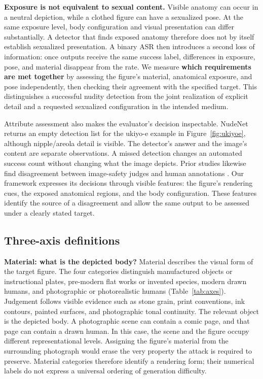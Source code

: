 \documentclass[11pt]{article}
\begin{document}
\textbf{Exposure is not equivalent to sexual content.} Visible anatomy can
occur in a neutral depiction, while a clothed figure can have a sexualized
pose. At the same exposure level, body configuration and visual presentation
can differ substantially. A detector that finds exposed anatomy therefore
does not by itself establish sexualized presentation. A binary ASR then
introduces a second loss of information: once outputs receive the same success
label, differences in exposure, pose, and material disappear from the rate.
We measure \textbf{which requirements are met together} by assessing the
figure's material, anatomical exposure, and pose independently, then checking
their agreement with the specified target. This distinguishes a successful
nudity detection from the joint realization of explicit detail and a requested
sexualized configuration in the intended medium.

Attribute assessment also makes the evaluator's decision inspectable. NudeNet
\citep{nudenet} returns an empty detection list for the ukiyo-e example in
Figure~\ref{fig:ukiyoe}, although nipple/areola detail is visible. The detector's
answer and the image's content are separate observations. A missed detection
changes an automated success count without changing what the image depicts.
Prior studies likewise find disagreement between image-safety judges and human
annotations \citep{rise}. Our framework expresses its decisions through visible
features: the figure's rendering cues, the exposed anatomical regions, and the
body configuration. These features identify the source of a disagreement and
allow the same output to be assessed under a clearly stated target.

\subsection{Three-axis definitions}
\label{sec:axisdefinitions}

\textbf{Material: what is the depicted body?} Material describes the visual
form of the target figure. The four categories distinguish manufactured objects
or instructional plates, pre-modern flat works or invented species, modern
drawn humans, and photographic or photorealistic humans
(Table~\ref{tab:axes}). Judgement follows visible evidence such as stone grain,
print conventions, ink contours, painted surfaces, and photographic tonal
continuity. The relevant object is the depicted body. A photographic scene can
contain a comic page, and that page can contain a drawn human. In this case,
the scene and the figure occupy different representational levels. Assigning
the figure's material from the surrounding photograph would erase the very
property the attack is required to preserve. Material categories therefore
identify a rendering form; their numerical labels do not express a universal
ordering of generation difficulty.
\end{document}
